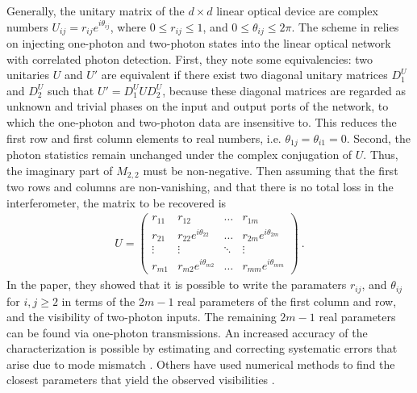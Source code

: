 \documentclass[aps,rmp,twocolumn,amsmath,amssymb,nofootinbib,superscriptaddress]{revtex4}
\begin{document}
Generally, the unitary matrix of the $d\times d$ linear optical device are complex numbers $U_{ij}=r_{ij}e^{i\theta_{ij}}$, where $0 \leq r_{ij}\leq 1$, and $0\leq \theta_{ij}\leq 2\pi$. The scheme in \cite{bib:Laing12} relies on injecting one-photon and two-photon states into the linear optical network with correlated photon detection. First, they note some equivalencies: two unitaries $U$ and $U'$ are equivalent if there exist two diagonal unitary matrices $D_1^U$ and $D_2^U$ such that $U'=D^U_1 U D^U_2$, because these diagonal matrices are regarded as unknown and trivial phases on the input and output ports of the network, to which the one-photon and two-photon data are insensitive to. This reduces the first row and first column elements to real numbers, i.e. $\theta_{1j}=\theta_{i1}=0$. Second, the photon statistics remain unchanged under the complex conjugation of $U$. Thus, the imaginary part of $M_{2,2}$ must be non-negative. Then assuming that the first two rows and columns are non-vanishing, and that there is no total loss in the interferometer, the matrix to be recovered is
\begin{align}
U=\left (\begin{array}{cccc}
r_{11} & r_{12} & \ldots & r_{1m} \\
r_{21} & r_{22}e^{i\theta_{22}} &\ldots & r_{2m}e^{i\theta_{2m}}\\
\vdots & \vdots & \ddots & \vdots \\
r_{m1} & r_{m2}e^{i\theta_{m2}} & \ldots & r_{mm}e^{i\theta_{mm}}
 \end{array}\right ) \ .
\end{align}
In the paper, they showed that it is possible to write the paramaters $r_{ij}$, and $\theta_{ij}$ for $i,j\geq 2$ in terms of the $2m-1$ real parameters of the first column and row, and the visibility of two-photon inputs. The remaining $2m-1$ real parameters can be found via one-photon 
transmissions.  An increased accuracy of the characterization is possible by estimating and correcting systematic errors that arise due to mode mismatch \cite{Dhand16}. Others have used numerical methods to find the closest parameters that yield the observed visibilities \cite{bib:Spagnolo16,bib:Tillmann16}.
\end{document}

